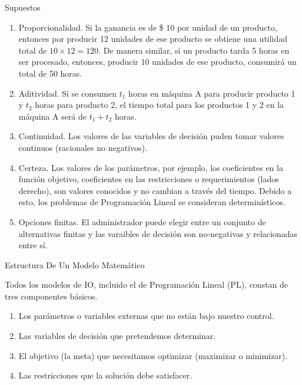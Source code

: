\documentclass[../slides.tex]{subfiles}
\begin{document}
\begin{frame}{Supuestos}
  \begin{enumerate} \parskip3mm \justifying
  \item<only@1> Proporcionalidad. Si la ganancia es de \$ 10 por unidad de un producto, entonces por producir 12 unidades de ese producto se obtiene una utilidad total de $10 \times 12 = 120.$ De manera similar, si un producto tarda 5 horas en ser procesado, entonces, producir 10 unidades de ese producto, consumirá un total de 50 horas. 
  \item<only@1> Aditividad. Si se consumen $t_1$ horas en máquina A para producir producto 1 y $t_2$ horas para producto 2, el tiempo total para los productos 1 y 2 en la máquina A será de $t_1 + t_2$ horas.
  \item<only@1> Continuidad. Los valores de las variables de decisión puden tomar valores continuos (racionales no negativos).
  \item<only@2> Certeza. Los valores de los parámetros, por ejemplo, los coeficientes en la función objetivo, coeficientes en las restricciones o requerimientos (lados derecho), son valores conocidos y no cambian a través del tiempo. Debido a esto, los problemas de Programación Lineal se consideran determinísticos.
  \item<only@2> Opciones finitas. El administrador puede elegir entre un conjunto de alternativas finitas y las varaibles de decisión son no-negativas y relacionadas entre sí.
  \end{enumerate}
\end{frame}



\begin{frame}{Estructura De Un Modelo Matemático}

Todos los modelos de IO, incluido el de Programación Lineal (PL), constan de tres componentes básicos.

  \begin{enumerate} \justifying 
  \item Los \alert{parámetros} o variables externas que no están bajo nuestro control.
  \item Las \alert{variables de decisión} que pretendemos determinar.
  \item El \alert{objetivo} (la meta) que necesitamos optimizar (maximizar o minimizar).
  \item Las \alert{restricciones} que la solución debe satisfacer.
  \end{enumerate}
   
\end{frame}
\end{document}
